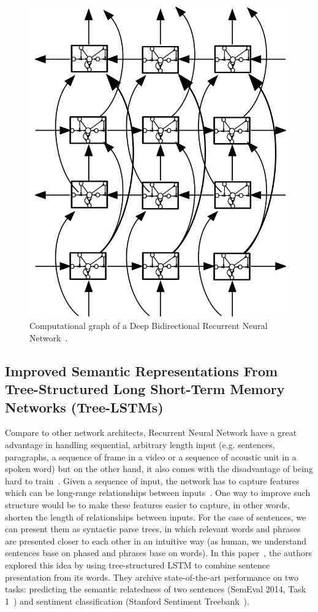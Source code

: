 \begin{figure}[H]
    \centering
    \includegraphics[scale=0.4]{figure/dblstm}
    \caption{Computational graph of a Deep Bidirectional Recurrent Neural Network~\cite{GravesLSTM}.}
    \label{fig:dblstm}
\end{figure}

\subsection{Improved Semantic Representations From Tree-Structured Long Short-Term Memory Networks (Tree-LSTMs)}\label{sec:treelstm}
Compare to other network architects, Recurrent Neural Network have a great advantage in handling sequential, arbitrary length input (e.g. sentences, paragraphs, a sequence of frame in a video or a sequence of acoustic unit in a spoken word) but on the other hand, it also comes with the disadvantage of being hard to train~\cite{hardRNN}.
Given a sequence of input, the network has to capture features which can be long-range relationships between inputs~\cite{socher2013recursive}.
One way to improve such structure would be to make these features easier to capture, in other words, shorten the length of relationships between inputs.
For the case of sentences, we can present them as syntactic parse trees, in which relevant words and phrases are presented closer to each other in an intuitive way (as human, we understand sentences base on phased and phrases base on words). 
In this paper~\cite{treeLSTM}, the authors explored this idea by using tree-structured LSTM to combine sentence presentation from its words.
They archive state-of-the-art performance on two tasks: predicting the semantic relatedness of two sentences (SemEval 2014, Task 1~\cite{SemeEvalTask1}) and sentiment classification (Stanford Sentiment Treebank~\cite{socher2013recursive}).


